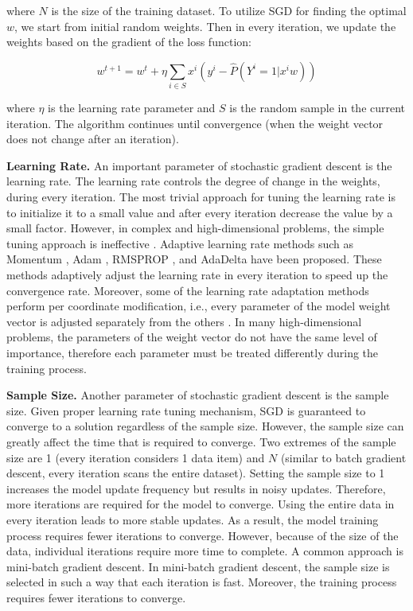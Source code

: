 where $N$ is the size of the training dataset.
To utilize SGD for finding the optimal $w$, we start from initial random weights.
Then in every iteration, we update the weights based on the gradient of the loss function:

\begin{center}
$${w}^{t+1} = {w}^t + \eta \sum_{i \in S} x^i (y^i - \hat{P}(Y^i = 1 | x^i w))$$
\end{center}

where $\eta$ is the learning rate parameter and $S$ is the random sample in the current iteration.
The algorithm continues until convergence (when the weight vector does not change after an iteration).

\textbf{Learning Rate.}
An important parameter of stochastic gradient descent is the learning rate.
The learning rate controls the degree of change in the weights, during every iteration.
The most trivial approach for tuning the learning rate is to initialize it to a small value and after every iteration decrease the value by a small factor.
However, in complex and high-dimensional problems, the simple tuning approach is ineffective \cite{schaul2013no}. 
Adaptive learning rate methods such as Momentum \cite{qian1999momentum}, Adam \cite{kingma2014adam}, RMSPROP \cite{tieleman2012lecture}, and AdaDelta \cite{zeiler2012adadelta} have been proposed.
These methods adaptively adjust the learning rate in every iteration to speed up the convergence rate.
Moreover, some of the learning rate adaptation methods perform per coordinate modification, i.e., every parameter of the model weight vector is adjusted separately from the others \cite{schaul2013no, tieleman2012lecture, zeiler2012adadelta}. 
In many high-dimensional problems, the parameters of the weight vector do not have the same level of importance, therefore each parameter must be treated differently during the training process.

\textbf{Sample Size.}
Another parameter of stochastic gradient descent is the sample size.
Given proper learning rate tuning mechanism, SGD is guaranteed to converge to a solution regardless of the sample size.
However, the sample size can greatly affect the time that is required to converge.
Two extremes of the sample size are 1 (every iteration considers 1 data item) and $N$ (similar to batch gradient descent, every iteration scans the entire dataset).
Setting the sample size to 1 increases the model update frequency but results in noisy updates.
Therefore, more iterations are required for the model to converge.
Using the entire data in every iteration leads to more stable updates.
As a result, the model training process requires fewer iterations to converge.
However, because of the size of the data, individual iterations require more time to complete.
A common approach is mini-batch gradient descent.
In mini-batch gradient descent, the sample size is selected in such a way that each iteration is fast.
Moreover, the training process requires fewer iterations to converge.


